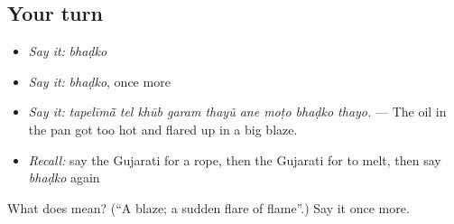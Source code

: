 \subsection*{Your turn}
\begin{itemize}
\raggedright
  \item \emph{Say it:} \emph{bhaḍko}
  \item \emph{Say it:} \emph{bhaḍko}, once more
  \item \emph{Say it:} \emph{tapelīmā̃ tel khūb garam thayũ ane moṭo bhaḍko thayo.} — The oil in the pan got too hot and flared up in a big blaze.
  \item \emph{Recall:} say the Gujarati for a rope, then the Gujarati for to melt, then say \emph{bhaḍko} again
\end{itemize}

\begin{tcolorbox}[breakable,colback=teal!4,colframe=teal!35!black,title={Before you move on}]
What does  mean? (\textquotedblleft{}A blaze; a sudden flare of flame\textquotedblright{}.) Say it once more.
\end{tcolorbox}
